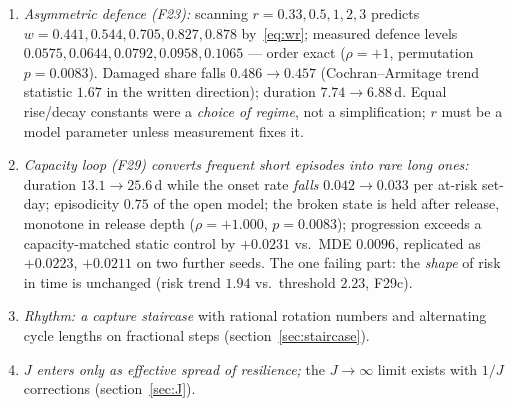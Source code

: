 \documentclass[11pt,a4paper]{article}
\theoremstyle{remark}
\begin{document}
\begin{enumerate}[leftmargin=1.2em]
direction, and label permutation calibrates the criterion at $0.049$; all four parts pass,
replicated on 2000 sets. Unfitted: ceiling
$\times3$ measured, $\tau_p$ scanned; accelerating the first stage gives $-1$ to
$-5\,\%$ vs.\ $-52\,\%$ for amplification, as predicted. Mechanism: priming raises the
\emph{top} of the window, not repair speed.
\item \emph{Asymmetric defence (F23):} scanning $r=0.33,0.5,1,2,3$ predicts
$w=0.441,0.544,0.705,0.827,0.878$ by~\eqref{eq:wr}; measured defence levels
$0.0575,0.0644,0.0792,0.0958,0.1065$ --- order exact ($\rho=+1$, permutation
$p=0.0083$). Damaged share falls $0.486\to0.457$ (Cochran--Armitage trend statistic $1.67$ in the written
direction); duration $7.74\to6.88$\,d.
Equal rise/decay constants were a \emph{choice of regime}, not a simplification; $r$
must be a model parameter unless measurement fixes it.
\item \emph{Capacity loop (F29) converts frequent short episodes into rare long ones:}
duration $13.1\to25.6$\,d while the onset rate \emph{falls} $0.042\to0.033$ per
at-risk set-day; episodicity $0.75$ of the open model; the broken state is held after
release, monotone in release depth ($\rho=+1.000$, $p=0.0083$); progression exceeds a
capacity-matched static control by $+0.0231$ vs.\ MDE $0.0096$, replicated as
$+0.0223$, $+0.0211$ on two further seeds. The one failing part: the \emph{shape} of risk
in time is unchanged (risk trend $1.94$ vs.\ threshold $2.23$, F29c).
\item \emph{Rhythm: a capture staircase} with rational rotation numbers and alternating
cycle lengths on fractional steps (section~\ref{sec:staircase}).
\item \emph{$J$ enters only as effective spread of resilience;} the $J\to\infty$ limit
exists with $1/J$ corrections (section~\ref{sec:J}).
\end{enumerate}
\end{document}
